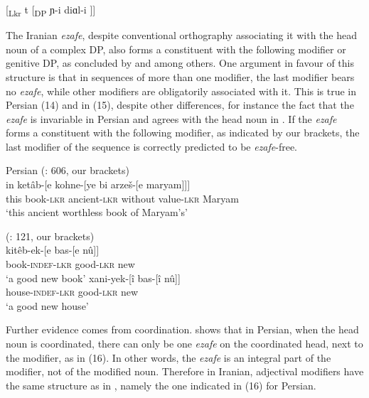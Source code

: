 \documentclass[output=paper]{langsci/langscibook}
\begin{document}
\ea%
    \label{ex:manzini:13}
    [\textsubscript{Lkr} t  [\textsubscript{DP} ɲ-i diɑl-i ]]     
\z

The Iranian \textit{ezafe}, despite conventional orthography associating it with the head noun of a complex DP, also forms a constituent with the following modifier  or genitive DP, as concluded by \citet{Larson2008} and \citet{Philip2012} among others. One argument in favour of this structure is that in sequences of more than one modifier, the last modifier bears no \textit{ezafe}, while other modifiers are obligatorily associated with it. This is true in Persian (14) and in   (15), despite other differences, for instance the fact that the \textit{ezafe} is invariable in Persian and agrees with the head noun in . If the \textit{ezafe} forms a constituent with the following modifier, as indicated by our brackets, the last modifier of the sequence is correctly predicted to be \textit{ezafe}{}-free. 

\ea%
         Persian (\citealt{Samvelian2007}: 606, our brackets)\label{ex:manzini:14}\\
    \gll in   ketâb-[e   kohne-[ye   bi arzeš-[e     maryam]]]\\
         this   book{}-\textsc{lkr}    ancient{}-\textsc{lkr}    without value{}-\textsc{lkr}    Maryam\\
    \glt ‘this ancient worthless book of Maryam’s’     
    \z

  
\ea%
     (\citealt{Yamakido2005}: 121, our brackets)\label{ex:manzini:15}\\
    \ea
    \gll kitêb-ek-[e    bas-[e    nû]]\\
         book-\textsc{indef-lkr}   good-\textsc{lkr}   new\\
    \glt ‘a good new book’
    \ex  
    \gll xani-yek-[î    bas-[î    nû]]\\
         house-\textsc{indef-lkr}   good-\textsc{lkr}   new\\
    \glt ‘a good new house’
    \z
\z    

Further evidence comes from coordination. \citet[37ff.]{Philip2012} shows that in Persian, when the head noun is coordinated, there can only be one \textit{ezafe} on the coordinated head, next to the modifier, as in (16). In other words, the \textit{ezafe} is an integral part of the modifier, not of the modified noun. Therefore in Iranian, adjectival modifiers have the same structure as in , namely the one indicated in (16) for Persian.
\end{document}

